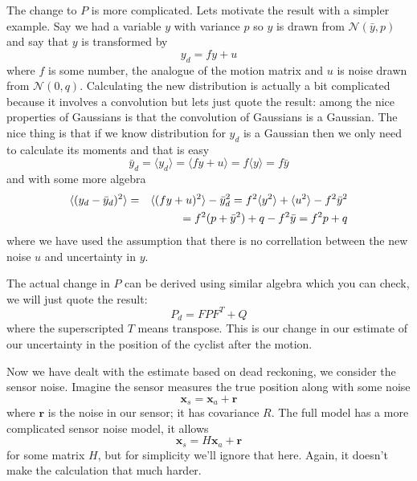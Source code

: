 \documentclass{article}
\begin{document}
The change to $P$ is more complicated. Lets motivate the result with a
simpler example. Say we had a variable $y$ with variance $p$ so $y$ is
drawn from $\mathcal{N}(\bar{y},p)$ and say that $y$ is transformed by 
\begin{equation}
y_d=fy+u
\end{equation}
where $f$ is some number, the analogue of the motion matrix and $u$ is
noise drawn from $\mathcal{N}(0,q)$. Calculating the new distribution
is actually a bit complicated because it involves a convolution but
lets just quote the result: among the nice properties of Gaussians is
that the convolution of Gaussians is a Gaussian. The nice thing is
that if we know distribution for $y_d$ is a Gaussian then we only need
to calculate its moments and that is easy
\begin{equation}
\bar{y}_d=\langle y_d\rangle =\langle fy+u\rangle=f\langle y\rangle=f\bar{y}
\end{equation}
and with some more algebra
\begin{eqnarray}
\langle (y_d-\bar{y}_d)^2\rangle &=&\langle (fy+u)^2 \rangle-\bar{y}_d^2=f^2\langle y^2\rangle+\langle u^2\rangle -f^2\bar{y}^2\cr
&&=f^2(p+\bar{y}^2)+q-f^2\bar{y}=f^2p+q
\end{eqnarray}
where we have used the assumption that there is no correllation
between the new noise $u$ and uncertainty in $y$.

The actual change in $P$ can be derived using similar algebra which
you can check, we will just quote the result:
\begin{equation}
P_d=FPF^T+Q
\end{equation}
where the superscripted $T$ means transpose. This is our change in our
estimate of our uncertainty in the position of the cyclist after the
motion.

Now we have dealt with the estimate based on dead reckoning, we
consider the sensor noise. Imagine the sensor measures the true
position along with some noise
\begin{equation}
\mathbf{x}_s=\mathbf{x}_a+\mathbf{r}
\end{equation}
where $\mathbf{r}$ is the noise in our sensor; it has covariance $R$. The full model has a more complicated sensor noise model, it allows
\begin{equation}
\mathbf{x}_s=H\mathbf{x}_a+\mathbf{r}
\end{equation}
for some matrix $H$, but for simplicity we'll ignore that here. Again,
it doesn't make the calculation that much harder. 
\end{document}
